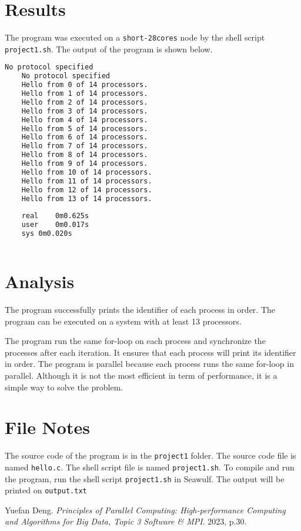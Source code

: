 \documentclass[12pt,a4paper]{article}
\begin{document}
\section{Results}
The program was executed on a \texttt{short-28cores} node by the shell script \texttt{project1.sh}. The output of the program is shown below.
\begin{lstlisting}[language=bash]
    No protocol specified
    No protocol specified
    Hello from 0 of 14 processors.
    Hello from 1 of 14 processors.
    Hello from 2 of 14 processors.
    Hello from 3 of 14 processors.
    Hello from 4 of 14 processors.
    Hello from 5 of 14 processors.
    Hello from 6 of 14 processors.
    Hello from 7 of 14 processors.
    Hello from 8 of 14 processors.
    Hello from 9 of 14 processors.
    Hello from 10 of 14 processors.
    Hello from 11 of 14 processors.
    Hello from 12 of 14 processors.
    Hello from 13 of 14 processors.
    
    real	0m0.625s
    user	0m0.017s
    sys	0m0.020s
    
\end{lstlisting}


\section{Analysis}
The program successfully prints the identifier of each process in order. 
The program can be executed on a system with at least 13 processors. 

The program run the same for-loop on each process and synchronize the processes after each iteration. 
It ensures that each process will print its identifier in order.
The program is parallel because each process runs the same for-loop in parallel.
Although it is not the most efficient in term of performance, it is a simple way to solve the problem.

\section*{File Notes}

The source code of the program is in the \texttt{project1} folder. The source code file is named \texttt{hello.c}. The shell script file is named \texttt{project1.sh}. To compile and run the program, run the shell script \texttt{project1.sh} in Seawulf. The output will be printed on \texttt{output.txt}

\begin{thebibliography}{1}

    Yuefan Deng.
    \textit{Principles of Parallel Computing: High-performance Computing and Algorithms for Big Data, Topic 3 Software \& MPI}.
    2023, p.30.
    
\end{thebibliography}
\end{document}
